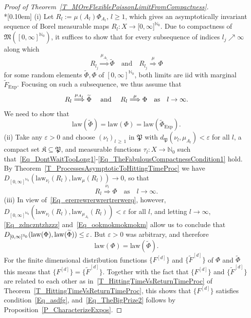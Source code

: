 \documentclass[10pt]{amsart}
\theoremstyle{definition}\newtheorem{defi}[theo]{Definition}\newtheorem{rema}[theo]{Remark}\newtheorem{exam}[theo]{Example}\newtheorem{exem}[theo]{Example}\newtheorem{nota}[theo]{Notation}
\newcommand{\Expl}{\mathrm{Exp}}
\newcommand{\law}{\mathrm{law}}
\newcommand{\frkK}{\mathfrak{K}}
\newcommand{\frkP}{\mathfrak{P}}
\newcommand{\frkM}{\mathfrak{M}}
\newcommand{\bbN}{\mathbb{N}}
\begin{document}
\begin{proof}[{Proof of Theorem~\ref{T_MOreFlexiblePoissonLimitFromCompactness}}]\ \\*[0.10em]
\noindent (i) Let $R_{l}:=\mu(A_{l})\Phi_{A_{l}}$, $l\geq1$, which gives an asymptotically invariant sequence of Borel measurable maps $R_{l} :X\rightarrow\lbrack0,\infty]^{\bbN_{0}}$. Due to compactness of $\frkM([0,\infty]^{\bbN_{0}})$, it suffices to show that for every subsequence of indices $l_{j}\nearrow\infty$ along which
\[
R_{l_{j} }\overset{\mu_{A_{l_{j}}}}{\Longrightarrow}\widetilde{\Phi}\quad\text{and}\quad R_{l_{j} }\overset{\mu}{\Longrightarrow}\Phi
\]
for some random elements $\widetilde {\Phi},\Phi$ of $[0,\infty]^{\bbN_{0}}$, both limits are iid with marginal $\widetilde{F}_{\Expl}$. Focusing on such a subsequence, we thus assume that
\begin{equation}\label{Eq_zdnczntzhzzz}
R_{l}\overset{\mu_{A_{l}}}{\Longrightarrow}\widetilde{\Phi}\text{ \quad and
\quad}R_{l}\overset{\mu}{\Longrightarrow}\Phi\quad\text{as}\quad l\rightarrow
\infty. 
\end{equation}
We need to show that
\begin{equation}\label{Eq_TheBigPrize2}
\law(\widetilde{\Phi})=\law(\Phi)=\law\left(\widetilde {\Phi}_{\Expl}\right). 
\end{equation}
(ii) Take any $\varepsilon>0$ and choose $(\nu_{l})_{l\,\geq\,1}$ in $\frkP$ with $d_{\frkP}(\nu_{l},\mu_{A_{l}})<\varepsilon$ for all $l$, a compact set $\frkK\subseteq\frkP$, and measurable functions $\tau_{l}:X\rightarrow\bbN_{0}$ such that~\eqref{Eq_DontWaitTooLong1}-\eqref{Eq_TheFabulousCompactnessCondition1} hold. By Theorem~\ref{T_ProcessesAsymptoticToHittingTimeProc} we have $D_{[0,\infty]^{\bbN_{0}}}(\law_{\nu_{l}}(R_{l}),\law_{\mu} (R_{l}))\rightarrow0$, so that
\begin{equation}\label{Eq_ookmokmokmokm}
R_{l}\overset{\nu_{l}}{\Longrightarrow}\Phi \quad \text{as}\quad l\rightarrow
\infty.
\end{equation}
(iii) In view of~\eqref{Eq_ererrewrerwrertrerwerq}, however, $D_{[0,\infty]^{\bbN_{0}}}(\law_{\nu_{l}}(R_{l}),\law _{\mu_{A_{l}}}(R_{l}))<\varepsilon$ for all $l$, and letting $l\rightarrow
\infty$, \eqref{Eq_zdnczntzhzzz} and~\eqref{Eq_ookmokmokmokm} allow us to conclude that $D_{[0,\infty]^{\bbN_{0}}}(\law(\Phi),\linebreak\law(\widetilde{\Phi}))\leq\varepsilon$. But $\varepsilon>0$ was arbitrary, and therefore
\begin{equation}
\law(\Phi)=\law\left(\widetilde{\Phi}\right).
\end{equation}
For the finite dimensional distribution functions $\{F^{[d]}\}$ and $\{\widetilde{F}^{[d]}\}$ of $\Phi$ and $\widetilde{\Phi}$ this means that $\{F^{[d]}\}=\{\widetilde{F}^{[d]}\}$. Together with the fact that $\{F^{[d]}\}$ and $\{\widetilde{F}^{[d]}\}$ are related to each other as in~\eqref{T_HittingTimeVsReturnTimeProc} of Theorem~\ref{T_HittingTimeVsReturnTimeProc}, this shows that $\{F^{[d]}\}$ satisfies condition~\eqref{Eq_asdfg}, and~\eqref{Eq_TheBigPrize2} follows by Proposition~\ref{P_CharacterizeExpos}.\qedhere
\end{proof}
\end{document}
